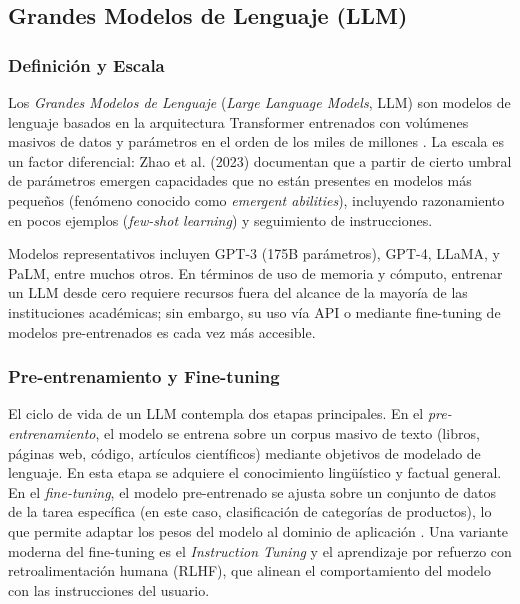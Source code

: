 \documentclass[11pt,a4paper]{article}
\begin{document}
\subsection{Grandes Modelos de Lenguaje (LLM)}

\subsubsection{Definición y Escala}

Los \emph{Grandes Modelos de Lenguaje} (\textit{Large Language Models}, LLM) son modelos de lenguaje basados en la arquitectura Transformer entrenados con volúmenes masivos de datos y parámetros en el orden de los miles de millones \cite{zhao2023}. La escala es un factor diferencial: Zhao et al. (2023) documentan que a partir de cierto umbral de parámetros emergen capacidades que no están presentes en modelos más pequeños (fenómeno conocido como \emph{emergent abilities}), incluyendo razonamiento en pocos ejemplos (\textit{few-shot learning}) y seguimiento de instrucciones.

Modelos representativos incluyen GPT-3 (175B parámetros), GPT-4, LLaMA, y PaLM, entre muchos otros. En términos de uso de memoria y cómputo, entrenar un LLM desde cero requiere recursos fuera del alcance de la mayoría de las instituciones académicas; sin embargo, su uso vía API o mediante fine-tuning de modelos pre-entrenados es cada vez más accesible.

\subsubsection{Pre-entrenamiento y Fine-tuning}

El ciclo de vida de un LLM contempla dos etapas principales. En el \emph{pre-entrenamiento}, el modelo se entrena sobre un corpus masivo de texto (libros, páginas web, código, artículos científicos) mediante objetivos de modelado de lenguaje. En esta etapa se adquiere el conocimiento lingüístico y factual general. En el \emph{fine-tuning}, el modelo pre-entrenado se ajusta sobre un conjunto de datos de la tarea específica (en este caso, clasificación de categorías de productos), lo que permite adaptar los pesos del modelo al dominio de aplicación \cite{devlin2019}. Una variante moderna del fine-tuning es el \textit{Instruction Tuning} y el aprendizaje por refuerzo con retroalimentación humana (RLHF), que alinean el comportamiento del modelo con las instrucciones del usuario.
\end{document}
